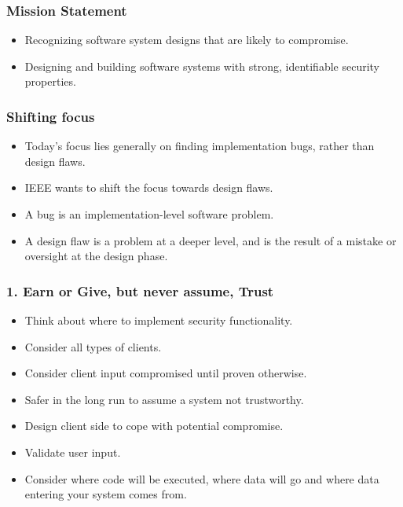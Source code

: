 \documentclass[12pt,norsk]{beamer}
\begin{document}
\begin{frame}
	
	\frametitle{Mission Statement}

	\begin{itemize}
		\item Recognizing software system designs that are likely to compromise.
		\item Designing and building software systems with strong, identifiable security properties.
	\end{itemize}		

\end{frame}

\begin{frame}
	
	\frametitle{Shifting focus}

	\begin{itemize}
		\item Today's focus lies generally on finding implementation bugs, rather than design flaws.
		\item IEEE wants to shift the focus towards design flaws.
		\item A bug is an implementation-level software problem.
		\item A design flaw is a problem at a deeper level, and is the result of a mistake or oversight at the design phase.
		
	\end{itemize}		

\end{frame}

\begin{frame}

	\frametitle{1. Earn or Give, but never assume, Trust}
	
	\begin{itemize}
		\item Think about where to implement security functionality. 
		\item Consider all types of clients.
		\item Consider client input compromised until proven otherwise.
		\item Safer in the long run to assume a system not trustworthy.
		\item Design client side to cope with potential compromise.
		\item Validate user input.
		\item Consider where code will be executed, where data will go and where data entering your system comes from. 
	\end{itemize}

\end{frame}
\end{document}
